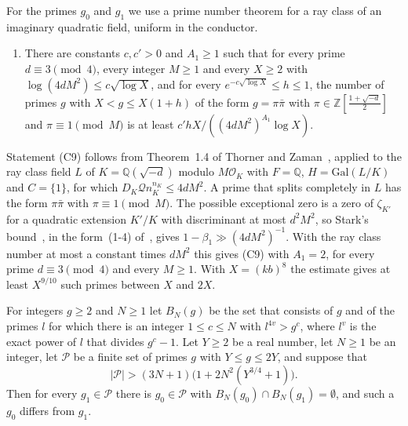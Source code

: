 For the primes $g_0$ and $g_1$ we use a prime number theorem for a ray class of an imaginary quadratic field, uniform in the conductor.
\begin{enumerate}
\item[(C9)] There are constants $c,c'>0$ and $A_1\ge1$ such that for every prime $d\equiv3\pmod4$, every integer $M\ge1$ and every $X\ge2$ with $\log(4dM^2)\le c\sqrt{\log X}$, and for every $e^{-c\sqrt{\log X}}\le h\le1$, the number of primes $g$ with $X<g\le X(1+h)$ of the form $g=\pi\bar\pi$ with $\pi\in\mathbb Z[\frac{1+\sqrt{-d}}2]$ and $\pi\equiv1\pmod M$ is at least $c'hX/((4dM^2)^{A_1}\log X)$.
\end{enumerate}
Statement (C9) follows from Theorem~1.4 of Thorner and Zaman~\cite{thornerzaman19}, applied to the ray class field $L$ of $K=\mathbb Q(\sqrt{-d})$ modulo $M\mathcal O_K$ with $F=\mathbb Q$, $H=\mathrm{Gal}(L/K)$ and $C=\{1\}$, for which $D_K\mathcal Q n_K^{n_K}\le4dM^2$. A prime that splits completely in $L$ has the form $\pi\bar\pi$ with $\pi\equiv1\pmod M$. The possible exceptional zero is a zero of $\zeta_{K'}$ for a quadratic extension $K'/K$ with discriminant at most $d^2M^2$, so Stark's bound~\cite[Theorem~1$'$]{stark74}, in the form~(1-4) of~\cite{thornerzaman19}, gives $1-\beta_1\gg(4dM^2)^{-1}$. With the ray class number at most a constant times $dM^2$ this gives (C9) with $A_1=2$, for every prime $d\equiv3\pmod4$ and every $M\ge1$. With $X=(kb)^8$ the estimate gives at least $X^{9/10}$ such primes between $X$ and $2X$.

\begin{lemma}\label{disjoint}
For integers $g\ge2$ and $N\ge1$ let $B_N(g)$ be the set that consists of $g$ and of the primes $l$ for which there is an integer $1\le c\le N$ with $l^{4v}>g^{c}$, where $l^{v}$ is the exact power of $l$ that divides $g^{c}-1$. Let $Y\ge2$ be a real number, let $N\ge1$ be an integer, let $\mathcal P$ be a finite set of primes $g$ with $Y\le g\le2Y$, and suppose that
\[
\lvert\mathcal P\rvert>(3N+1)\big(1+2N^2(Y^{3/4}+1)\big).
\]
Then for every $g_1\in\mathcal P$ there is $g_0\in\mathcal P$ with $B_N(g_0)\cap B_N(g_1)=\emptyset$, and such a $g_0$ differs from $g_1$.
\end{lemma}

